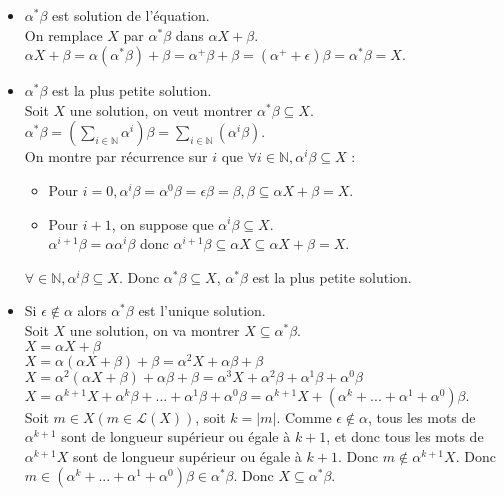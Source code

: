 \begin{itemize}
	\item $\alpha^* \beta$ est solution de l'équation.\\

	On remplace $X$ par $\alpha^* \beta$ dans $\alpha X + \beta$.\\
	$\alpha X + \beta = \alpha(\alpha^* \beta) + \beta = \alpha^+ \beta + \beta = (\alpha^+ + \epsilon)\beta = \alpha^* \beta=X$.\\
	
	\item $\alpha^* \beta$ est la plus petite solution.\\
	Soit $X$ une solution, on veut montrer $\alpha^* \beta \subseteq X$.\\
	$\alpha^* \beta = (\sum_{i \in \mathbb{N}} \alpha^i)\beta = \sum_{i \in \mathbb{N}}(\alpha^i \beta)$.\\
	On montre par récurrence sur $i$ que $\forall i \in \mathbb{N}, \alpha^i\beta \subseteq X$ :
	
	\begin{itemize}
		\item Pour $i=0, \alpha^i \beta = \alpha^0 \beta = \epsilon \beta = \beta, \beta \subseteq \alpha X + \beta = X$.
		\item Pour $i+1$, on suppose que $\alpha^i \beta \subseteq X$.\\
		$\alpha^{i+1} \beta = \alpha \alpha^i \beta$ donc $\alpha^{i+1} \beta \subseteq \alpha X \subseteq \alpha X + \beta = X$.\\
	\end{itemize}
	
	$\forall \in \mathbb{N}, \alpha^i \beta \subseteq X$. Donc $\alpha^* \beta \subseteq X$, $\alpha^* \beta$ est la plus petite solution.\\

	\item Si $\epsilon \not \in \alpha$ alors $\alpha^* \beta$ est l'unique solution.\\

	Soit $X$ une solution, on va montrer $X \subseteq \alpha^* \beta$.\\
	$X = \alpha X + \beta$\\
	$X = \alpha(\alpha X + \beta)+\beta = \alpha^2 X + \alpha \beta + \beta$\\
	$X = \alpha^2(\alpha X + \beta) + \alpha \beta + \beta = \alpha^3 X + \alpha^2 \beta + \alpha^1 \beta + \alpha^0 \beta$\\
	$X = \alpha^{k+1} X + \alpha^k \beta + ... + \alpha^1 \beta + \alpha^0 \beta = \alpha^{k+1} X + (\alpha^k + ... + \alpha^1 + \alpha^0) \beta$.\\

	Soit $m \in X (m \in \mathcal{L}(X))$, soit $k = \left|m\right|$. Comme $\epsilon \not \in \alpha$, tous les mots de $\alpha^{k+1}$ sont de longueur supérieur ou égale à $k+1$, et donc tous les mots de $\alpha^{k+1} X $ sont de longueur supérieur ou égale à $k+1$. Donc $m \not \in \alpha^{k+1} X$. Donc $m \in (\alpha^k + ... + \alpha^1 + \alpha^0)\beta \in \alpha^* \beta$. Donc $X \subseteq \alpha^* \beta$.\\
\end{itemize}

